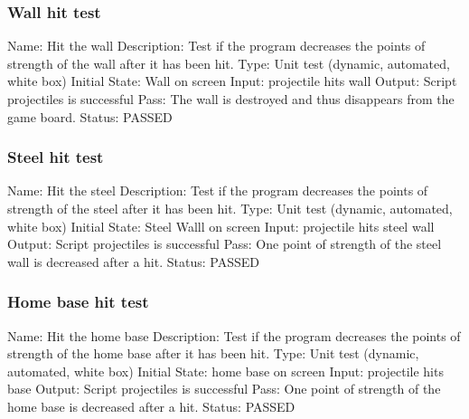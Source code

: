 \documentclass{article}
\begin{document}
\subsubsection{Wall hit test}
\label{sec:3.2.7}
Name:  Hit the wall\newline
Description: Test if the program decreases the points of strength of the wall 
after it has been hit. \newline
Type: Unit test (dynamic, automated, white box) \newline
Initial State:  Wall on screen\newline
Input: projectile hits wall\newline
Output: Script projectiles is successful  \newline
Pass:  The wall is destroyed and thus disappears from the game board.
\newline
\newline Status: PASSED

\subsubsection{Steel hit test}
\label{sec:3.2.8}
Name:  Hit the steel\newline
Description: Test if the program decreases the points of strength of the steel 
after it has been hit. \newline
Type: Unit test (dynamic, automated, white box) \newline
Initial State:  Steel Walll on screen\newline
Input: projectile hits steel wall\newline
Output: Script projectiles is successful  \newline
Pass:  One point of strength of the steel wall is decreased after a hit. 
\newline
\newline Status: PASSED

\subsubsection{Home base hit test}
\label{sec:3.2.9}
Name:  Hit the home base\newline
Description: Test if the program decreases the points of strength of the home 
base after it has been hit. \newline
Type: Unit test (dynamic, automated, white box) \newline
Initial State:  home base on screen\newline
Input: projectile hits base\newline
Output: Script projectiles is successful  \newline
Pass:  One point of strength of the home base is decreased after a hit. 
\newline
\newline Status: PASSED
\end{document}
